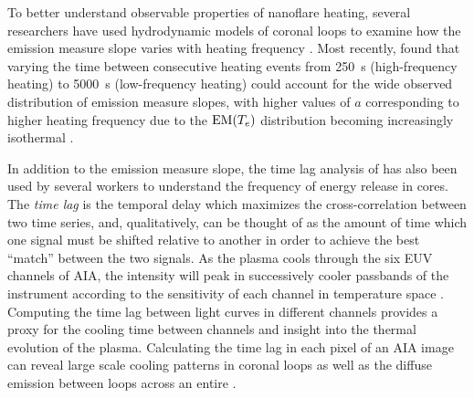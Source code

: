 To better understand observable properties of nanoflare heating, several researchers have used hydrodynamic models of coronal loops to examine how the emission measure slope varies with heating frequency \citep{mulu-moore_can_2011,bradshaw_diagnosing_2012,reep_diagnosing_2013}. Most recently, \citet{cargill_active_2014} found that varying the time between consecutive heating events from \SI{250}{\second} (high-frequency heating) to \SI{5000}{\second} (low-frequency heating) could account for the wide observed distribution of emission measure slopes, with higher values of $a$ corresponding to higher heating frequency due to the $\textup{EM}(T_e)$ distribution becoming increasingly isothermal \citep[see also][]{barnes_inference_2016-1}.

In addition to the emission measure slope, the time lag analysis of \citet{viall_evidence_2012} has also been used by several workers to understand the frequency of energy release in \AR{} cores. The \textit{time lag} is the temporal delay which maximizes the cross-correlation between two time series, and, qualitatively, can be thought of as the amount of time which one signal must be shifted relative to another in order to achieve the best ``match'' between the two signals. As the plasma cools through the six EUV channels of AIA, the intensity will peak in successively cooler passbands of the instrument according to the sensitivity of each channel in temperature space \citep{viall_patterns_2011}. Computing the time lag between light curves in different channels provides a proxy for the cooling time between channels and insight into the thermal evolution of the plasma. Calculating the time lag in each pixel of an AIA image can reveal large scale cooling patterns in coronal loops as well as the diffuse emission between loops across an entire \AR{}.

